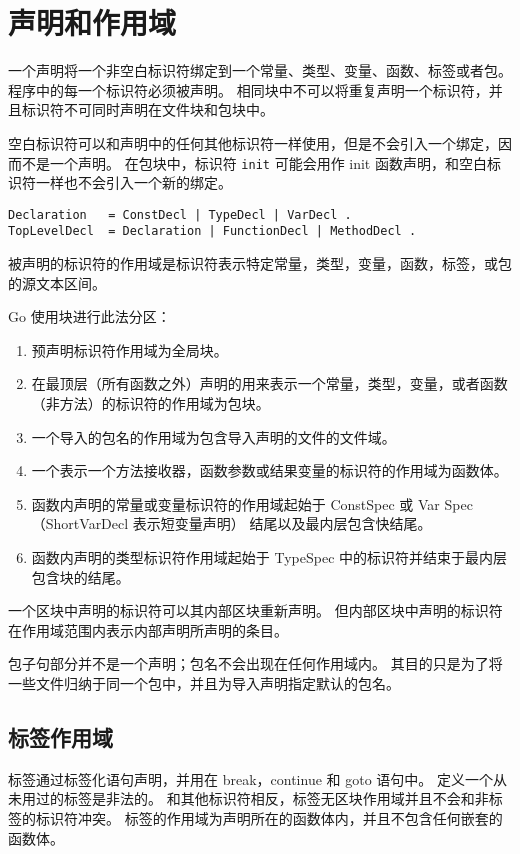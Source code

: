 \chapter{声明和作用域} \label{ch:declarations and scope}
一个声明将一个非空白标识符绑定到一个常量、类型、变量、函数、标签或者包。
程序中的每一个标识符必须被声明。
相同块中不可以将重复声明一个标识符，并且标识符不可同时声明在文件块和包块中。

空白标识符可以和声明中的任何其他标识符一样使用，但是不会引入一个绑定，因而不是一个声明。
在包块中，标识符 \lstinline|init| 可能会用作 init 函数声明，和空白标识符一样也不会引入一个新的绑定。
\begin{lstlisting}[style=EBNF]
Declaration   = ConstDecl | TypeDecl | VarDecl .
TopLevelDecl  = Declaration | FunctionDecl | MethodDecl .
\end{lstlisting}
被声明的标识符的作用域是标识符表示特定常量，类型，变量，函数，标签，或包的源文本区间。

Go 使用块进行此法分区：
\begin{enumerate}[labelindent=\parindent,leftmargin=*]
\item 预声明标识符作用域为全局块。
\item 在最顶层（所有函数之外）声明的用来表示一个常量，类型，变量，或者函数（非方法）的标识符的作用域为包块。
\item 一个导入的包名的作用域为包含导入声明的文件的文件域。
\item 一个表示一个方法接收器，函数参数或结果变量的标识符的作用域为函数体。
\item 函数内声明的常量或变量标识符的作用域起始于 ConstSpec 或 Var Spec（ShortVarDecl 表示短变量声明） 结尾以及最内层包含快结尾。
\item 函数内声明的类型标识符作用域起始于 TypeSpec 中的标识符并结束于最内层包含块的结尾。
\end{enumerate}

一个区块中声明的标识符可以其内部区块重新声明。
但内部区块中声明的标识符在作用域范围内表示内部声明所声明的条目。

包子句部分并不是一个声明；包名不会出现在任何作用域内。
其目的只是为了将一些文件归纳于同一个包中，并且为导入声明指定默认的包名。

\section{标签作用域}
标签通过标签化语句声明，并用在 break，continue 和 goto 语句中。
定义一个从未用过的标签是非法的。
和其他标识符相反，标签无区块作用域并且不会和非标签的标识符冲突。
标签的作用域为声明所在的函数体内，并且不包含任何嵌套的函数体。

